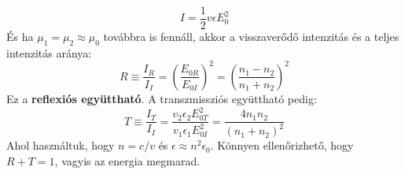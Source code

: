 \documentclass[a4paper,12pt]{article}
\begin{document}
\begin{equation}
    I = \frac{1}{2} v \epsilon E_0^2
\end{equation}
És ha $\mu_1 = \mu_2 \approx \mu_0$ továbbra is fennáll, akkor a visszaverődő intenzitás és a teljes intenzitás aránya:
\begin{equation}
    R \equiv \frac{I_R}{I_I} = \left( \frac{E_{0R}}{E_{0I}} \right)^2 = \left(\frac{n_1 - n_2}{n_1 + n_2}\right)^2
\end{equation}
Ez a \textbf{reflexiós együttható}. A transzmissziós együttható pedig:
\begin{equation}
    T \equiv \frac{I_T}{I_I} = \frac{v_2 \epsilon_2 E_{0T}^2}{v_1 \epsilon_1 E_{0I}^2} = \frac{4 n_1 n_2}{(n_1 + n_2)^2}
\end{equation}
Ahol használtuk, hogy $n = c/v$ és $\epsilon \approx n^2 \epsilon_0$. Könnyen ellenőrizhető, hogy $R + T = 1$, vagyis az energia megmarad.
\end{document}
